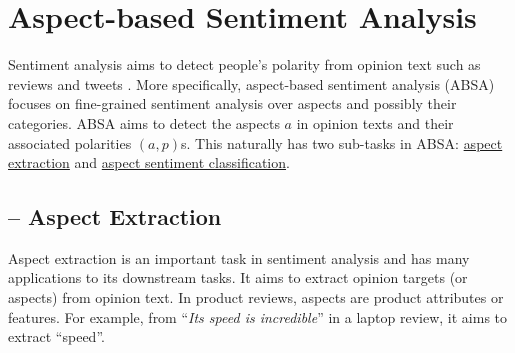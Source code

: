 \section{Aspect-based Sentiment Analysis}
\label{chap6:sec:sa}

Sentiment analysis aims to detect people's polarity from opinion text such as reviews and tweets \cite{Liu2012}.
More specifically, aspect-based sentiment analysis (ABSA) focuses on fine-grained sentiment analysis over aspects and possibly their categories.
ABSA aims to detect the aspects $a$ in opinion texts and their associated polarities $(a, p)$s.
This naturally has two sub-tasks in ABSA: \underline{aspect extraction} and \underline{aspect sentiment classification}.

\subsection{-- Aspect Extraction}


Aspect extraction is an important task in sentiment analysis \cite{HuL2004} and has many applications to its downstream tasks\cite{Liu2012}.
It aims to extract opinion targets (or aspects) from opinion text. 
In product reviews, aspects are product attributes or features. 
For example, from ``\textit{Its speed is incredible}'' in a laptop review, it aims to extract ``speed''. 

